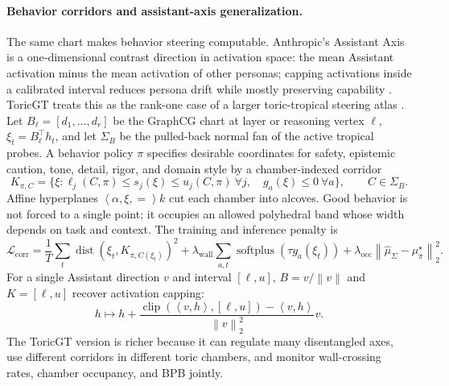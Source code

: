 \documentclass[10pt]{article}
\theoremstyle{definition}
\theoremstyle{plain}
\theoremstyle{remark}
\newcommand{\norm}[1]{\left\lVert #1\right\rVert}
\newcommand{\ip}[2]{\left\langle #1,#2\right\rangle}
\begin{document}
\paragraph{Behavior corridors and assistant-axis generalization.}
The same chart makes behavior steering computable.  Anthropic's Assistant Axis is a one-dimensional contrast direction in activation space: the mean Assistant activation minus the mean activation of other personas; capping activations inside a calibrated interval reduces persona drift while mostly preserving capability \cite{lu2026assistantaxis}.  ToricGT treats this as the rank-one case of a larger toric-tropical steering atlas \cite{schreiber2026tropicalquivers}.  Let $B_\ell=[d_1,\ldots,d_r]$ be the GraphCG chart at layer or reasoning vertex $\ell$, $\xi_t=B_\ell^\top h_t$, and let $\Sigma_B$ be the pulled-back normal fan of the active tropical probes.  A behavior policy $\pi$ specifies desirable coordinates for safety, epistemic caution, tone, detail, rigor, and domain style by a chamber-indexed corridor
\begin{equation}
  K_{\pi,C}=\{\xi:\ell_j(C,\pi)\le s_j(\xi)\le u_j(C,\pi)\ \forall j,\quad
  g_a(\xi)\le 0\ \forall a\},
  \qquad C\in\Sigma_B .
\end{equation}
Affine hyperplanes $\ip{\alpha,\xi}=k$ cut each chamber into alcoves.  Good behavior is not forced to a single point; it occupies an allowed polyhedral band whose width depends on task and context.  The training and inference penalty is
\begin{equation}
  \mathcal L_{\mathrm{corr}}=
  \frac1T\sum_t \operatorname{dist}(\xi_t,K_{\pi,C(\xi_t)})^2+
  \lambda_{\mathrm{wall}}\sum_{a,t}\operatorname{softplus}(\tau g_a(\xi_t))+
  \lambda_{\mathrm{occ}}\norm{\widehat\mu_{\Sigma}-\mu_\pi^\star}_2^2 .
\end{equation}
For a single Assistant direction $v$ and interval $[\ell,u]$, $B=v/\norm{v}$ and $K=[\ell,u]$ recover activation capping:
\begin{equation}
  h\mapsto h+
  \frac{\operatorname{clip}(\ip{v}{h},[\ell,u])-\ip{v}{h}}{\norm{v}_2^2}v .
\end{equation}
The ToricGT version is richer because it can regulate many disentangled axes, use different corridors in different toric chambers, and monitor wall-crossing rates, chamber occupancy, and BPB jointly.
\end{document}
